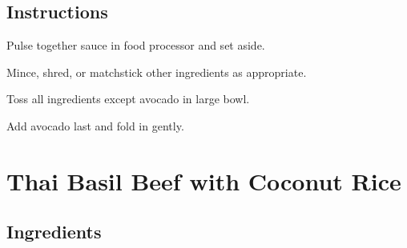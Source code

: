 \documentclass[letterpaper,10pt,english]{sphinxmanual}
\begin{document}

%
\begin{sphinxVerbatim}[commandchars=\\\{\}]
   

   

   

   

   

   
\end{sphinxVerbatim}


\section{Instructions}
\label{\detokenize{FRB:instructions}}
Pulse together sauce in food processor and set aside.

Mince, shred, or matchstick other ingredients as appropriate.

Toss all ingredients except avocado in large bowl.

Add avocado last and fold in gently.


\chapter{Thai Basil Beef with Coconut Rice}
\label{\detokenize{Thai_Basil_Beef:thai-basil-beef-with-coconut-rice}}\label{\detokenize{Thai_Basil_Beef::doc}}

\section{Ingredients}
\label{\detokenize{Thai_Basil_Beef:ingredients}}

%
\begin{sphinxVerbatim}[commandchars=\\\{\}]
   

   

  

     

         

    
\end{sphinxVerbatim}
\end{document}
